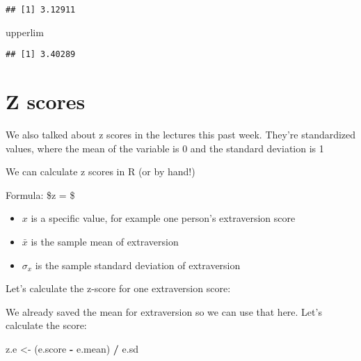 \documentclass[
]{article}
\newenvironment{Shaded}{\begin{snugshade}}{\end{snugshade}}
\newcommand{\AttributeTok}[1]{\textcolor[rgb]{0.13,0.29,0.53}{#1}}
\newcommand{\ConstantTok}[1]{\textcolor[rgb]{0.56,0.35,0.01}{#1}}
\newcommand{\DecValTok}[1]{\textcolor[rgb]{0.00,0.00,0.81}{#1}}
\newcommand{\FunctionTok}[1]{\textcolor[rgb]{0.13,0.29,0.53}{\textbf{#1}}}
\newcommand{\NormalTok}[1]{#1}
\newcommand{\OtherTok}[1]{\textcolor[rgb]{0.56,0.35,0.01}{#1}}
\newcommand{\SpecialCharTok}[1]{\textcolor[rgb]{0.81,0.36,0.00}{\textbf{#1}}}
\newcommand{\StringTok}[1]{\textcolor[rgb]{0.31,0.60,0.02}{#1}}
\providecommand{\tightlist}{%
  \setlength{\itemsep}{0pt}\setlength{\parskip}{0pt}}
\begin{document}
\begin{verbatim}
## [1] 3.12911
\end{verbatim}

\begin{Shaded}
\begin{Highlighting}[]
\NormalTok{upperlim}
\end{Highlighting}
\end{Shaded}

\begin{verbatim}
## [1] 3.40289
\end{verbatim}

\hypertarget{z-scores}{%
\section{Z scores}\label{z-scores}}

We also talked about z scores in the lectures this past week. They're
standardized values, where the mean of the variable is 0 and the
standard deviation is 1

We can calculate z scores in R (or by hand!)

Formula: \$z =  \$

\begin{itemize}
\tightlist
\item
  \(x\) is a specific value, for example one person's extraversion score
\item
  \(\bar{x}\) is the sample mean of extraversion
\item
  \(\sigma_{x}\) is the sample standard deviation of extraversion
\end{itemize}

Let's calculate the z-score for one extraversion score:

\begin{Shaded}
\end{Shaded}

We already saved the mean for extraversion so we can use that here.
Let's calculate the score:

\begin{Shaded}
\begin{Highlighting}[]
\NormalTok{z.e }\OtherTok{\textless{}{-}}\NormalTok{ (e.score }\SpecialCharTok{{-}}\NormalTok{ e.mean) }\SpecialCharTok{/}\NormalTok{ e.sd}
\end{Highlighting}
\end{Shaded}
\end{document}
